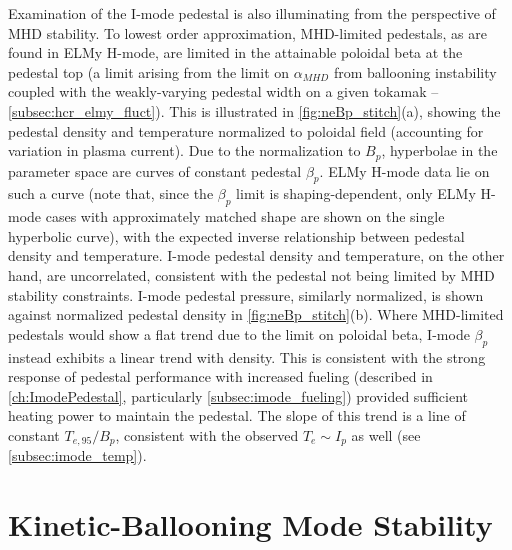 Examination of the I-mode pedestal is also illuminating from the perspective of MHD stability.  To lowest order approximation, MHD-limited pedestals, as are found in ELMy H-mode, are limited in the attainable poloidal beta at the pedestal top (a limit arising from the limit on $\alpha_{MHD}$ from ballooning instability coupled with the weakly-varying pedestal width on a given tokamak -- \cf \cref{subsec:hcr_elmy_fluct}).  This is illustrated in \cref{fig:neBp_stitch}(a), showing the pedestal density and temperature normalized to poloidal field (accounting for variation in plasma current).  Due to the normalization to $B_p$, hyperbolae in the parameter space are curves of constant pedestal $\beta_{p}$.  ELMy H-mode data lie on such a curve (note that, since the $\beta_p$ limit is shaping-dependent, only ELMy H-mode cases with approximately matched shape are shown on the single hyperbolic curve), with the expected inverse relationship between pedestal density and temperature.  I-mode pedestal density and temperature, on the other hand, are uncorrelated, consistent with the pedestal not being limited by MHD stability constraints.  I-mode pedestal pressure, similarly normalized, is shown against normalized pedestal density in \cref{fig:neBp_stitch}(b).  Where MHD-limited pedestals would show a flat trend due to the limit on poloidal beta, I-mode $\beta_p$ instead exhibits a linear trend with density.  This is consistent with the strong response of pedestal performance with increased fueling (described in \cref{ch:ImodePedestal}, particularly \cref{subsec:imode_fueling}) provided sufficient heating power to maintain the pedestal.  The slope of this trend is a line of constant $T_{e,95}/B_p$, consistent with the observed $T_e \sim I_p$ as well (see \cref{subsec:imode_temp}).\nicesectionending

\section{Kinetic-Ballooning Mode Stability}\label{sec:imode_baloo}

